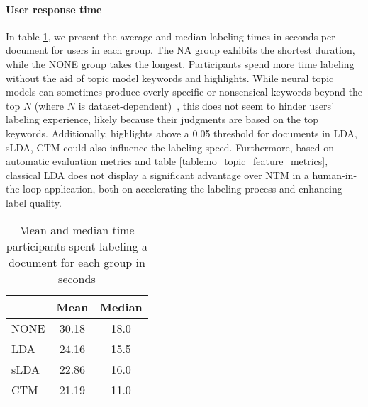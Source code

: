 

\paragraph{User response time} In table \ref{table:user_response_time}, we present the average and median labeling times in seconds per document for users in each group. The NA group exhibits the shortest duration, while the NONE group takes the longest. Participants spend more time labeling without the aid of topic model keywords and highlights. While neural topic models can sometimes produce overly specific or nonsensical keywords beyond the top \(N\) (where \(N\) is dataset-dependent)~\cite{put citation}, this does not seem to hinder users' labeling experience, likely because their judgments are based on the top keywords. Additionally, highlights above a 0.05 threshold for documents in LDA, sLDA, CTM could also influence the labeling speed. Furthermore, based on automatic evaluation metrics and table \ref{table:no_topic_feature_metrics}, classical LDA does not display a significant advantage over NTM in a human-in-the-loop application, both on accelerating the labeling process and enhancing label quality.


\begin{table}[ht]
\centering
\begin{tabular}{l c c}
\hline
 & Mean & Median \\
\hline
\hline
NONE  & 30.18 & 18.0\\
\hline
LDA  & 24.16 & 15.5\\
\hline
sLDA & 22.86 & 16.0\\
\hline
CTM & 21.19 & 11.0\\ %
\hline
\end{tabular}

\caption{Mean and median time participants spent labeling a document for each group in seconds}
\label{table:user_response_time}
\end{table}

